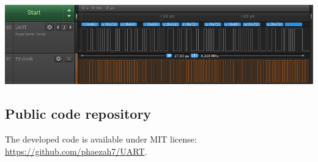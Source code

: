 \documentclass[a4,11pt]{article}
\begin{document}
\begin{center}
    \label{maximum}
    \includegraphics[width=\textwidth]{img/maximum.png}
\end{center}

\subsection{Public code repository}
The developed code is available under MIT license:
\url{https://github.com/phaezah7/UART}.





\end{document}
